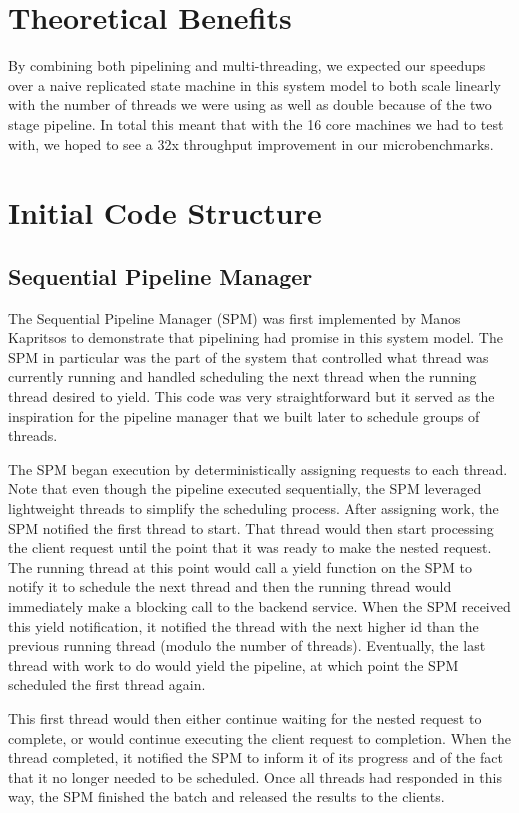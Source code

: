 \documentclass[11pt, oneside]{report}
\begin{document}
\section{Theoretical Benefits}

By combining both pipelining and multi-threading, we expected our speedups over a naive replicated state machine in this system model to both scale linearly with the number of threads we were using as well as double because of the two stage pipeline. In total this meant that with the 16 core machines we had to test with, we hoped to see a 32x throughput improvement in our microbenchmarks.

\section{Initial Code Structure}

\subsection{Sequential Pipeline Manager}

The Sequential Pipeline Manager (SPM) was first implemented by Manos Kapritsos to demonstrate that pipelining had promise in this system model. The SPM in particular was the part of the system that controlled what thread was currently running and handled scheduling the next thread when the running thread desired to yield. This code was very straightforward but it served as the inspiration for the pipeline manager that we built later to schedule groups of threads.

The SPM began execution by deterministically assigning requests to each thread. Note that even though the pipeline executed sequentially, the SPM leveraged lightweight threads to simplify the scheduling process. After assigning work, the SPM notified the first thread to start. That thread would then start processing the client request until the point that it was ready to make the nested request. The running thread at this point would call a yield function on the SPM to notify it to schedule the next thread and then the running thread would immediately make a blocking call to the backend service. When the SPM received this yield notification, it notified the thread with the next higher id than the previous running thread (modulo the number of threads). Eventually, the last thread with work to do would yield the pipeline, at which point the SPM scheduled the first thread again. 

This first thread would then either continue waiting for the nested request to complete, or would continue executing the client request to completion. When the thread completed, it notified the SPM to inform it of its progress and of the fact that it no longer needed to be scheduled. Once all threads had responded in this way, the SPM finished the batch and released the results to the clients.
\end{document}
